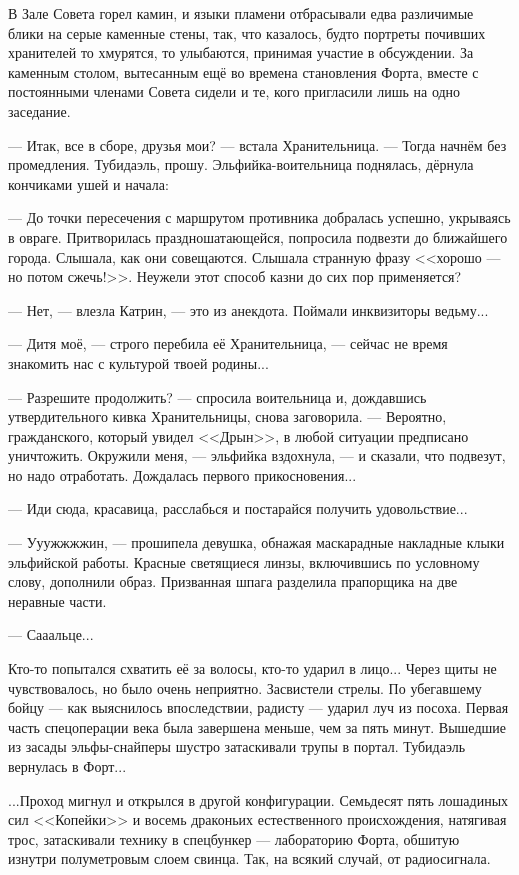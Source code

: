 В Зале Совета горел камин, и языки пламени отбрасывали едва различимые блики на серые каменные стены, так,
что казалось, будто портреты почивших хранителей то хмурятся, то улыбаются, принимая участие в обсуждении.
За каменным столом, вытесанным ещё во времена становления Форта, вместе с постоянными членами Совета сидели и те,
кого пригласили лишь на одно заседание.


--- Итак, все в сборе, друзья мои? --- встала Хранительница. --- Тогда начнём без промедления. Тубидаэль, прошу.
Эльфийка-воительница поднялась, дёрнула кончиками ушей и начала:

--- До точки пересечения с маршрутом противника добралась успешно, укрываясь в овраге.
Притворилась праздношатающейся, попросила подвезти до ближайшего города. Слышала, как они совещаются.
Слышала странную фразу <<хорошо --- но потом сжечь!>>. Неужели этот способ казни до сих пор применяется?

--- Нет, --- влезла Катрин, --- это из анекдота. Поймали инквизиторы ведьму...

--- Дитя моё, --- строго перебила её Хранительница, --- сейчас не время знакомить нас с культурой твоей родины...

--- Разрешите продолжить? --- спросила воительница и, дождавшись утвердительного кивка Хранительницы, снова заговорила.
--- Вероятно, гражданского, который увидел <<Дрын>>, в любой ситуации предписано уничтожить.
Окружили меня, --- эльфийка вздохнула, --- и сказали, что подвезут, но надо отработать. Дождалась первого прикосновения...

\emptypar

--- Иди сюда, красавица, расслабься и постарайся получить удовольствие...

--- Ууужжжжин, --- прошипела девушка, обнажая маскарадные накладные клыки эльфийской работы.
Красные светящиеся линзы, включившись по условному слову, дополнили образ.
Призванная шпага разделила прапорщика на две неравные части.

--- Сааальце...

Кто-то попытался схватить её за волосы, кто-то ударил в лицо... Через щиты не чувствовалось, но было очень неприятно.
Засвистели стрелы. По убегавшему бойцу --- как выяснилось впоследствии, радисту --- ударил луч из посоха.
Первая часть спецоперации века была завершена меньше, чем за пять минут.
Вышедшие из засады эльфы-снайперы шустро затаскивали трупы в портал. Тубидаэль вернулась в Форт...

...Проход мигнул и открылся в другой конфигурации.
Семьдесят пять лошадиных сил <<Копейки>> и восемь драконьих естественного происхождения, натягивая трос,
затаскивали технику в спецбункер --- лабораторию Форта, обшитую изнутри полуметровым слоем свинца.
Так, на всякий случай, от радиосигнала.

